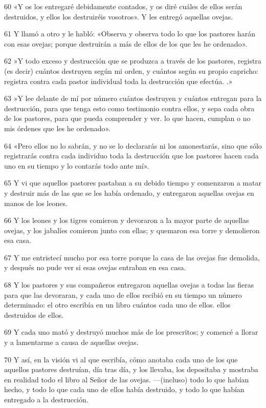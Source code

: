 \par 60 «Y os los entregaré debidamente contados, y os diré cuáles de ellos serán destruidos, y ellos los destruiréis vosotros». Y les entregó aquellas ovejas.
\par 61 Y llamó a otro y le habló: «Observa y observa todo lo que los pastores harán con esas ovejas; porque destruirán a más de ellos de los que les he ordenado».
\par 62 »Y todo exceso y destrucción que se produzca a través de los pastores, registra (es decir) cuántos destruyen según mi orden, y cuántos según su propio capricho: registra contra cada pastor individual toda la destrucción que efectúa. .»
\par 63 »Y lee delante de mí por número cuántos destruyen y cuántos entregan para la destrucción, para que tenga esto como testimonio contra ellos, y sepa cada obra de los pastores, para que pueda comprender y ver. lo que hacen, cumplan o no mis órdenes que les he ordenado».
\par 64 «Pero ellos no lo sabrán, y no se lo declararás ni los amonestarás, sino que sólo registrarás contra cada individuo toda la destrucción que los pastores hacen cada uno en su tiempo y lo contarás todo ante mí».
\par 65 Y vi que aquellos pastores pastaban a su debido tiempo y comenzaron a matar y destruir más de las que se les había ordenado, y entregaron aquellas ovejas en manos de los leones.
\par 66 Y los leones y los tigres comieron y devoraron a la mayor parte de aquellas ovejas, y los jabalíes comieron junto con ellas; y quemaron esa torre y demolieron esa casa.
\par 67 Y me entristecí mucho por esa torre porque la casa de las ovejas fue demolida, y después no pude ver si esas ovejas entraban en esa casa.
\par 68 Y los pastores y sus compañeros entregaron aquellas ovejas a todas las fieras para que las devoraran, y cada uno de ellos recibió en su tiempo un número determinado: el otro escribía en un libro cuántos cada uno de ellos. ellos destruidos de ellos.
\par 69 Y cada uno mató y destruyó muchos más de los prescritos; y comencé a llorar y a lamentarme a causa de aquellas ovejas.
\par 70 Y así, en la visión vi al que escribía, cómo anotaba cada uno de los que aquellos pastores destruían, día tras día, y los llevaba, los depositaba y mostraba en realidad todo el libro al Señor de las ovejas. —(incluso) todo lo que habían hecho, y todo lo que cada uno de ellos había destruido, y todo lo que habían entregado a la destrucción.
